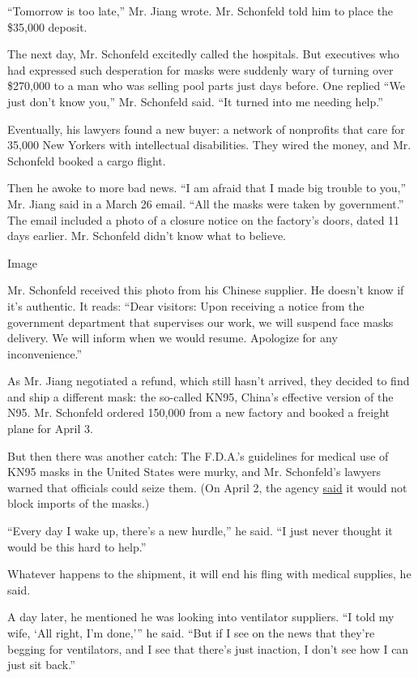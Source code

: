 ``Tomorrow is too late,'' Mr. Jiang wrote. Mr. Schonfeld told him to
place the \$35,000 deposit.

The next day, Mr. Schonfeld excitedly called the hospitals. But
executives who had expressed such desperation for masks were suddenly
wary of turning over \$270,000 to a man who was selling pool parts just
days before. One replied ``We just don't know you,'' Mr. Schonfeld said.
``It turned into me needing help.''

Eventually, his lawyers found a new buyer: a network of nonprofits that
care for 35,000 New Yorkers with intellectual disabilities. They wired
the money, and Mr. Schonfeld booked a cargo flight.

Then he awoke to more bad news. ``I am afraid that I made big trouble to
you,'' Mr. Jiang said in a March 26 email. ``All the masks were taken by
government.'' The email included a photo of a closure notice on the
factory's doors, dated 11 days earlier. Mr. Schonfeld didn't know what
to believe.

Image

Mr. Schonfeld received this photo from his Chinese supplier. He doesn't
know if it's authentic. It reads: ``Dear visitors: Upon receiving a
notice from the government department that supervises our work, we will
suspend face masks delivery. We will inform when we would resume.
Apologize for any inconvenience.''

As Mr. Jiang negotiated a refund, which still hasn't arrived, they
decided to find and ship a different mask: the so-called KN95, China's
effective version of the N95. Mr. Schonfeld ordered 150,000 from a new
factory and booked a freight plane for April 3.

But then there was another catch: The F.D.A.'s guidelines for medical
use of KN95 masks in the United States were murky, and Mr. Schonfeld's
lawyers warned that officials could seize them. (On April 2, the agency
\href{https://www.buzzfeednews.com/article/kenbensinger/the-fda-now-says-it-will-allow-imports-of-kn95-masks-an}{said}
it would not block imports of the masks.)

``Every day I wake up, there's a new hurdle,'' he said. ``I just never
thought it would be this hard to help.''

Whatever happens to the shipment, it will end his fling with medical
supplies, he said.

A day later, he mentioned he was looking into ventilator suppliers. ``I
told my wife, `All right, I'm done,''' he said. ``But if I see on the
news that they're begging for ventilators, and I see that there's just
inaction, I don't see how I can just sit back.''

